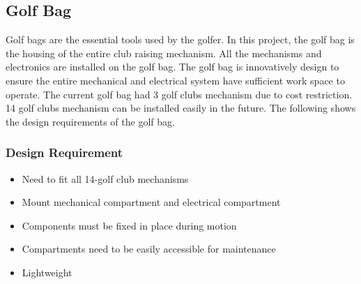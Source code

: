 \documentclass[11pt,landscape]{article}
\begin{document}
\newpage
\begin{multicols}{3}
    \subsection{Golf Bag}
        Golf bags are the essential tools used by the golfer. In this project, the
    golf bag is the housing of the entire club raising mechanism. All the mechanisms
    and electronics are installed on the golf bag. The golf bag is innovatively design
    to ensure the entire mechanical and electrical system have sufficient work
    space to operate. The current golf bag had 3 golf clubs mechanism due to cost restriction. 14 golf clubs mechanism can be installed easily in the future. The following shows the design requirements of the golf bag.
 
    
    \subsubsection{Design Requirement}
    \begin{itemize}
        \item Need to fit all 14-golf club mechanisms
        \item Mount mechanical compartment and electrical compartment
        \item Components must be fixed in place during motion
        \item Compartments need to be easily accessible for maintenance
        \item Lightweight 
    \end{itemize}
    

\end{multicols}
\end{document}

